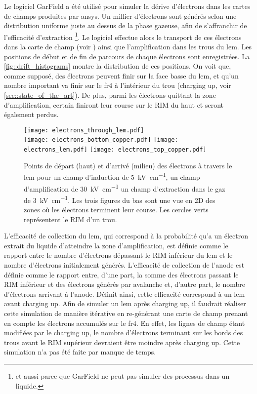       Le logiciel GarField a été utilisé pour simuler la dérive d'électrons dans les cartes de champs produites par \gls{ansys}. Un millier d'électrons sont générés selon une distribution uniforme juste au dessus de la phase gazeuse, afin de s'affranchir de l'efficacité d'extraction \footnote{et aussi parce que GarField ne peut pas simuler des processus dans un liquide.}. Le logiciel effectue alors le transport de ces électrons dans la carte de champ (voir \cite{garfield}) ainsi que l'amplification dans les trous du \gls{lem}. Les positions de début et de fin de parcours de chaque électrons sont enregistrées. La \autoref{fig::drift_histograms} montre la distribution de ces positions. On voit que, comme supposé, des électrons peuvent finir sur la face basse du \gls{lem}, et qu'un nombre important va finir sur le \gls{fr4} à l'intérieur du trou (charging up, voir \autoref{sec::state_of_the_art}). De plus, parmi les électrons quittant la zone d'amplification, certain finiront leur course sur le RIM du haut et seront également perdus.

      \begin{figure}[!htb]
        \centering
        \texttt{[image: electrons\_through\_lem.pdf]}\\\vspace{0.1cm}
        \texttt{[image: electrons\_bottom\_copper.pdf]}
        \texttt{[image: electrons\_lem.pdf]}
        \texttt{[image: electrons\_top\_copper.pdf]}
        \caption[Points de départ et d'arrivé des électrons à travers le LEM]{\label{fig::drift_histograms}Points de départ (haut) et d'arrivé (milieu) des électrons à travers le \gls{lem} pour un champ d'induction de \SI{5}{\kilo\volt\per\centi\meter}, un champ d'amplification de \SI{30}{\kilo\volt\per\centi\meter} un champ d'extraction dans le gaz de \SI{3}{\kilo\volt\per\centi\meter}. Les trois figures du bas sont une vue en 2D des zones où les électrons terminent leur course. Les cercles verts représentent le RIM d'un trou.}
      \end{figure}
          
      L'efficacité de collection du \gls{lem}, qui correspond à la probabilité qu'a un électron extrait du liquide d'atteindre la zone d'amplification, est définie comme le rapport entre le nombre d'électrons dépassant le RIM inférieur du \gls{lem} et le nombre d'électrons initialement générés. L'efficacité de collection de l'anode est définie comme le rapport entre, d'une part, la somme des électrons passant le RIM inférieur et des électrons générés par avalanche et, d'autre part, le nombre d'électrons arrivant à l'anode. Définit ainsi, cette efficacité correspond à un \gls{lem} avant charging up. Afin de simuler un \gls{lem} après charging up, il faudrait réaliser cette simulation de manière itérative en re-générant une carte de champ prenant en compte les électrons accumulés sur le \gls{fr4}. En effet, les lignes de champ étant modifiées par le charging up, le nombre d'électrons terminant sur les bords des trous avant le RIM supérieur devraient être moindre après charging up. Cette simulation n'a pas été faite par manque de temps.
        
